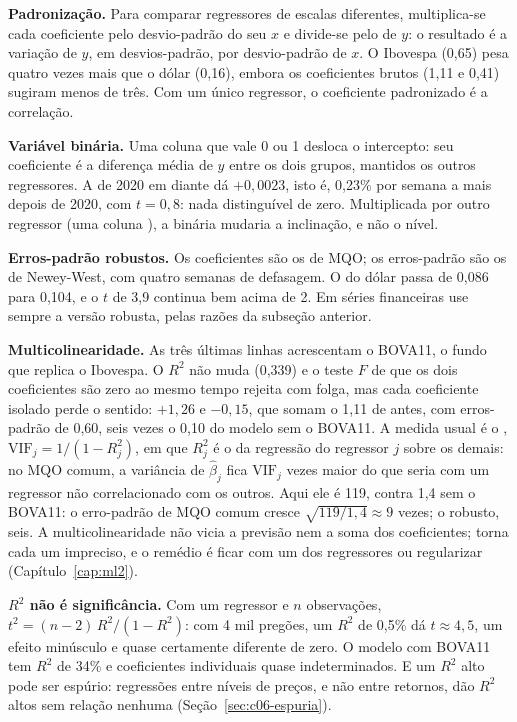 \textbf{Padronização.} Para comparar regressores de escalas diferentes, multiplica-se cada coeficiente pelo desvio-padrão do seu $x$ e divide-se pelo de $y$: o resultado é a variação de $y$, em desvios-padrão, por desvio-padrão de $x$. O Ibovespa (0,65) pesa quatro vezes mais que o dólar (0,16), embora os coeficientes brutos (1,11 e 0,41) sugiram menos de três. Com um único regressor, o coeficiente padronizado é a correlação.

\textbf{Variável binária.} Uma coluna que vale 0 ou 1 desloca o intercepto: seu coeficiente é a diferença média de $y$ entre os dois grupos, mantidos os outros regressores. A de 2020 em diante dá $+0,0023$, isto é, 0,23\% por semana a mais depois de 2020, com $t = 0,8$: nada distinguível de zero. Multiplicada por outro regressor (uma coluna ), a binária mudaria a inclinação, e não o nível.

\textbf{Erros-padrão robustos.} Os coeficientes são os de MQO; os erros-padrão são os de Newey-West, com quatro semanas de defasagem. O do dólar passa de 0,086 para 0,104, e o $t$ de 3,9 continua bem acima de 2. Em séries financeiras use sempre a versão robusta, pelas razões da subseção anterior.

\textbf{Multicolinearidade.} As três últimas linhas acrescentam o BOVA11, o fundo que replica o Ibovespa. O $R^2$ não muda (0,339) e o teste $F$ de que os dois coeficientes são zero ao mesmo tempo rejeita com folga, mas cada coeficiente isolado perde o sentido: $+1,26$ e $-0,15$, que somam o 1,11 de antes, com erros-padrão de 0,60, seis vezes o 0,10 do modelo sem o BOVA11. A medida usual é o , $\text{VIF}_j = 1/(1-R_j^2)$, em que $R_j^2$ é o da regressão do regressor $j$ sobre os demais: no MQO comum, a variância de $\hat\beta_j$ fica $\text{VIF}_j$ vezes maior do que seria com um regressor não correlacionado com os outros. Aqui ele é 119, contra 1,4 sem o BOVA11: o erro-padrão de MQO comum cresce $\sqrt{119/1,4} \approx 9$ vezes; o robusto, seis. A multicolinearidade não vicia a previsão nem a soma dos coeficientes; torna cada um impreciso, e o remédio é ficar com um dos regressores ou regularizar (Capítulo~\ref{cap:ml2}).

\textbf{$R^2$ não é significância.} Com um regressor e $n$ observações, $t^2 = (n-2)\,R^2/(1-R^2)$: com 4 mil pregões, um $R^2$ de 0,5\% dá $t \approx 4,5$, um efeito minúsculo e quase certamente diferente de zero. O modelo com BOVA11 tem $R^2$ de 34\% e coeficientes individuais quase indeterminados. E um $R^2$ alto pode ser espúrio: regressões entre níveis de preços, e não entre retornos, dão $R^2$ altos sem relação nenhuma (Seção~\ref{sec:c06-espuria}).

